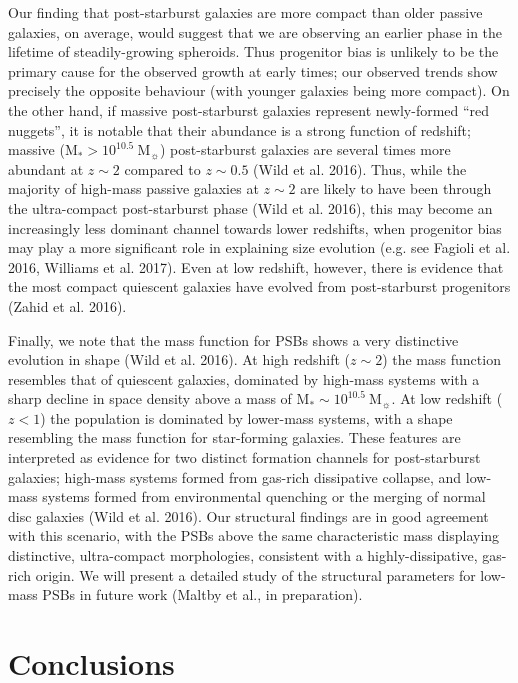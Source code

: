 \documentclass[a4paper,fleqn,usenatbib,useAMS]{mnras}
\begin{document}
Our finding that post-starburst galaxies are more compact than older
passive  galaxies, on average, would suggest that we are observing an
earlier phase in the lifetime of steadily-growing spheroids.  Thus
progenitor bias is unlikely to be the primary cause for the observed
growth at early times; our observed trends show
precisely the opposite behaviour (with younger galaxies being more
compact).  On the other hand, if massive post-starburst galaxies
represent newly-formed ``red nuggets'', it is notable that their
abundance is a strong function of redshift; massive (M$_{\ast}>
10^{10.5} ~$M$_{\sun}$) post-starburst galaxies are several times more
abundant at $z\sim 2$ compared to $z\sim 0.5$ (Wild et
al. 2016). Thus, while the majority of high-mass passive galaxies at
$z\sim 2$ are likely to have been through the ultra-compact
post-starburst phase (Wild et al. 2016), this may become an
increasingly less dominant channel towards lower redshifts, when
progenitor bias may play a more significant role in explaining size
evolution (e.g. see Fagioli et al. 2016, Williams et al. 2017).
Even at low redshift, however, there is evidence that the most compact
 quiescent galaxies  have evolved from
post-starburst progenitors (Zahid et al. 2016).


Finally, we note that the mass function for PSBs shows a very
distinctive evolution in shape (Wild et al. 2016).  At high redshift ($z\sim
2$) the mass function resembles that of quiescent galaxies, dominated
by high-mass systems with a sharp decline in space density above a
mass of M$_{\ast}\sim 10^{10.5} ~$M$_{\sun}$. At low
redshift ($z<1$) the population is dominated by lower-mass systems,
with a shape resembling the mass function for star-forming
galaxies. These features are interpreted as evidence for two distinct
formation channels for post-starburst galaxies; high-mass systems
formed from gas-rich dissipative collapse, and low-mass systems formed
from environmental quenching or the merging of normal disc galaxies (Wild et
al. 2016). Our structural findings are in good agreement with this
scenario, with the PSBs above the same characteristic mass displaying
distinctive, ultra-compact morphologies, consistent with a
highly-dissipative, gas-rich origin.  We will present a detailed study
of the structural parameters for low-mass PSBs in future work (Maltby
et al., in preparation).




\section{Conclusions}
\end{document}
